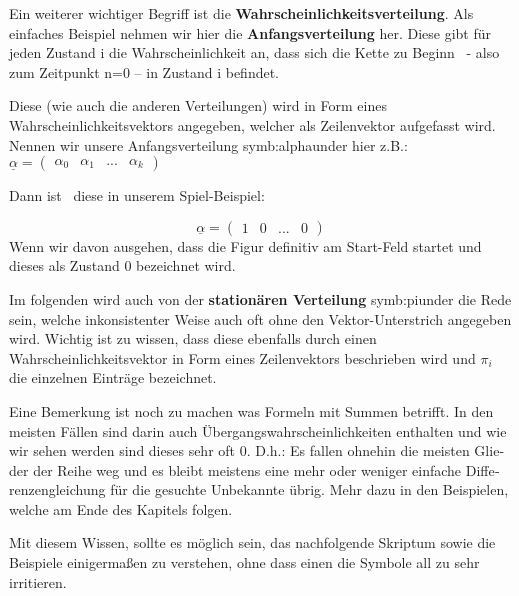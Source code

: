 \bigskip

{
    Ein weiterer wichtiger Begriff ist die \textbf{Wahrscheinlichkeitsverteilung}.
    Als einfaches Beispiel nehmen wir hier die \textbf{Anfangsverteilung} her. Diese
gibt f\"ur jeden Zustand i die Wahrscheinlichkeit an, dass sich die
Kette zu Beginn \ {}- also zum Zeitpunkt n=0 -- in Zustand i befindet.}

{
Diese (wie auch die anderen Verteilungen) wird in Form eines
Wahrscheinlichkeitsvektors angegeben, welcher als Zeilenvektor
aufgefasst wird. Nennen wir unsere Anfangsverteilung \gls{symb:alphaunder} hier z.B.: 
$\underline{{\alpha }}=(\begin{matrix}\alpha _{0}&\alpha
_{1}&...&\alpha _{k}\end{matrix})$}

{
Dann ist \ diese in unserem Spiel-Beispiel:}

\begin{equation*}
\underline{{\alpha }}=(\begin{matrix}1&0&...&0\end{matrix})
\end{equation*}
{
Wenn wir davon ausgehen, dass die Figur definitiv am Start-Feld startet
und dieses als Zustand 0 bezeichnet wird.}

{
    Im folgenden wird auch von der \textbf{station\"aren Verteilung} \gls{symb:piunder}
 die Rede sein, welche
inkonsistenter Weise auch oft ohne den Vektor-Unterstrich angegeben
wird. Wichtig ist zu wissen, dass diese ebenfalls durch einen
Wahrscheinlichkeitsvektor in Form eines Zeilenvektors beschrieben wird
und  $\pi _{i}$ die einzelnen Eintr\"age bezeichnet. }

{
\foreignlanguage{ngerman}{Eine
Beme}\foreignlanguage{ngerman}{rk}\foreignlanguage{ngerman}{ung ist
noch zu machen was }\foreignlanguage{ngerman}{Formeln mit Summen
betrifft. In den meisten F\"allen sind darin auch
\"Ubergangswahrscheinlichkeiten enthalten und wie wir sehen werden sind
dieses sehr oft 0. D.h.: Es fallen ohnehin die meisten Glieder der
Reihe weg und es bleibt meistens eine mehr oder weniger einfache
Differenzengleichung f\"ur die gesuchte Unbekannte \"ubrig. Mehr dazu
in den Beisp}\foreignlanguage{ngerman}{ielen, welche am Ende des
Kapitels folgen}\foreignlanguage{ngerman}{.}}

{
Mit diesem Wissen, sollte es m\"oglich sein, das nachfolgende Skriptum
sowie die Beispiele einigerma{\ss}en zu verstehen, ohne dass einen die
Symbole all zu sehr irritieren.}




%
